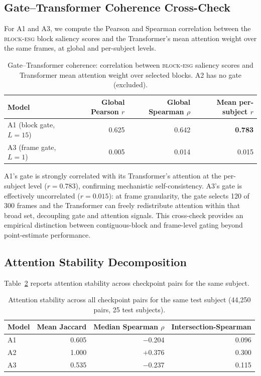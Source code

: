 \documentclass[a4paper,fleqn]{cas-sc}
\newcommand{\besg}{\textsc{block-esg}\xspace}
\begin{document}
\subsection{Gate--Transformer Coherence Cross-Check}
\label{sec:interp_coherence}

For A1 and A3, we compute the Pearson and Spearman correlation between the
\besg block saliency scores and the Transformer's mean attention weight over
the same frames, at global and per-subject levels.

\begin{table}[h!]
  \centering
  \caption{%
    Gate--Transformer coherence: correlation between \besg saliency scores
    and Transformer mean attention weight over selected blocks.
    A2 has no gate (excluded).}
  \label{tab:coherence}
  \small
  \begin{tabularx}{\linewidth}{@{}l r r r@{}}
    \toprule
    Model & Global Pearson $r$ & Global Spearman $\rho$ & Mean per-subject $r$ \\
    \midrule
    A1 (block gate, $L=15$)   & 0.625 & 0.642 & \textbf{0.783} \\
    A3 (frame gate, $L=1$)    & 0.005 & 0.014 & 0.015 \\
    \bottomrule
  \end{tabularx}
\end{table}

A1's gate is strongly correlated with its Transformer's attention at the
per-subject level ($r=0.783$), confirming mechanistic self-consistency.
A3's gate is effectively uncorrelated ($r=0.015$): at frame granularity,
the gate selects 120 of 300 frames and the Transformer can freely redistribute
attention within that broad set, decoupling gate and attention signals.
This cross-check provides an empirical distinction between contiguous-block
and frame-level gating beyond point-estimate performance.

\subsection{Attention Stability Decomposition}
\label{sec:interp_stability}

Table~\ref{tab:stability} reports attention stability across checkpoint pairs
for the same subject.

\begin{table}[h!]
  \centering
  \caption{%
    Attention stability across all checkpoint pairs for the same test subject
    (44,250 pairs, 25 test subjects).}
  \label{tab:stability}
  \small
  \begin{tabularx}{\linewidth}{@{}l r r r@{}}
    \toprule
    Model & Mean Jaccard & Median Spearman $\rho$ & Intersection-Spearman \\
    \midrule
    A1 & 0.605 & $-$0.204 & 0.096 \\
    A2 & 1.000 & $+$0.376 & 0.300 \\
    A3 & 0.535 & $-$0.237 & 0.115 \\
    \bottomrule
  \end{tabularx}
\end{table}
\end{document}
